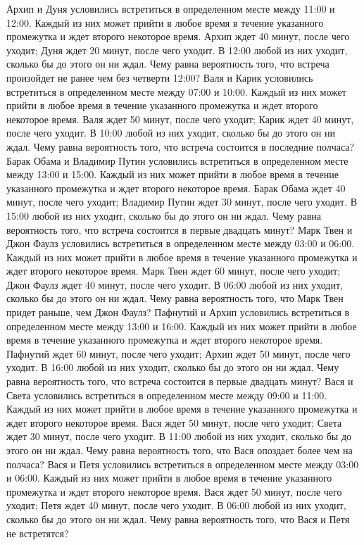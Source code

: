 Архип и Дуня условились встретиться в определенном месте между 11:00 и 12:00. Каждый из них может прийти в любое время в течение указанного промежутка и ждет второго некоторое время. Архип ждет 40 минут, после чего уходит; Дуня ждет 20 минут, после чего уходит. В 12:00 любой из них уходит, сколько бы до этого он ни ждал. Чему равна вероятность того, что встреча произойдет не ранее чем без четверти 12:00?
Валя и Карик условились встретиться в определенном месте между 07:00 и 10:00. Каждый из них может прийти в любое время в течение указанного промежутка и ждет второго некоторое время. Валя ждет 50 минут, после чего уходит; Карик ждет 40 минут, после чего уходит. В 10:00 любой из них уходит, сколько бы до этого он ни ждал. Чему равна вероятность того, что встреча состоится в последние полчаса?
Барак Обама и Владимир Путин условились встретиться в определенном месте между 13:00 и 15:00. Каждый из них может прийти в любое время в течение указанного промежутка и ждет второго некоторое время. Барак Обама ждет 40 минут, после чего уходит; Владимир Путин ждет 30 минут, после чего уходит. В 15:00 любой из них уходит, сколько бы до этого он ни ждал. Чему равна вероятность того, что встреча состоится в первые двадцать минут?
Марк Твен и Джон Фаулз условились встретиться в определенном месте между 03:00 и 06:00. Каждый из них может прийти в любое время в течение указанного промежутка и ждет второго некоторое время. Марк Твен ждет 60 минут, после чего уходит; Джон Фаулз ждет 40 минут, после чего уходит. В 06:00 любой из них уходит, сколько бы до этого он ни ждал. Чему равна вероятность того, что Марк Твен придет раньше, чем Джон Фаулз?
Пафнутий и Архип условились встретиться в определенном месте между 13:00 и 16:00. Каждый из них может прийти в любое время в течение указанного промежутка и ждет второго некоторое время. Пафнутий ждет 60 минут, после чего уходит; Архип ждет 50 минут, после чего уходит. В 16:00 любой из них уходит, сколько бы до этого он ни ждал. Чему равна вероятность того, что встреча состоится в первые двадцать минут?
Вася и Света условились встретиться в определенном месте между 09:00 и 11:00. Каждый из них может прийти в любое время в течение указанного промежутка и ждет второго некоторое время. Вася ждет 50 минут, после чего уходит; Света ждет 30 минут, после чего уходит. В 11:00 любой из них уходит, сколько бы до этого он ни ждал. Чему равна вероятность того, что Вася опоздает более чем на полчаса?
Вася и Петя условились встретиться в определенном месте между 03:00 и 06:00. Каждый из них может прийти в любое время в течение указанного промежутка и ждет второго некоторое время. Вася ждет 50 минут, после чего уходит; Петя ждет 40 минут, после чего уходит. В 06:00 любой из них уходит, сколько бы до этого он ни ждал. Чему равна вероятность того, что Вася и Петя не встретятся?
